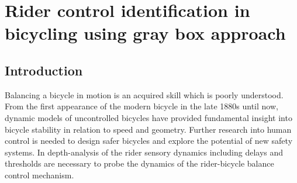 \chapter{Rider control identification in bicycling using gray box approach} \label{hapticFB}

\section{Introduction}

Balancing a bicycle in motion is an acquired skill which is poorly understood. From the first appearance of the modern bicycle in the late 1880s until now, dynamic models of uncontrolled bicycles have provided fundamental insight into bicycle stability in relation to speed and geometry\cite{meijaard2007linearized, kooijman2011bicycle}. Further research into human control is needed to design safer bicycles and explore the potential of new safety systems.  In depth-analysis of the rider sensory dynamics  including delays and thresholds are necessary to probe the dynamics of the rider-bicycle balance control mechanism.

